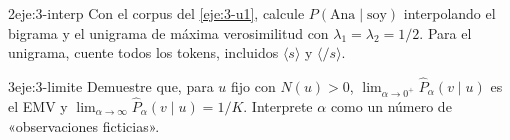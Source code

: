 \begin{ejercicio}{2}{eje:3-interp}
Con el corpus del \cref{eje:3-u1}, calcule $P(\text{Ana}\mid\text{soy})$ interpolando el bigrama y el unigrama de máxima verosimilitud con $\lambda_1=\lambda_2=1/2$. Para el unigrama, cuente todos los tokens, incluidos $\langle s\rangle$ y $\langle/s\rangle$.
\end{ejercicio}

\begin{ejercicio}{3}{eje:3-limite}
Demuestre que, para $u$ fijo con $N(u)>0$, $\lim_{\alpha\to 0^{+}}\widehat{P}_{\alpha}(v\mid u)$ es el EMV y $\lim_{\alpha\to\infty}\widehat{P}_{\alpha}(v\mid u)=1/K$. Interprete $\alpha$ como un número de «observaciones ficticias».
\end{ejercicio}
